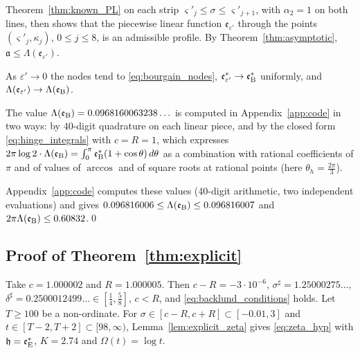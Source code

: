 \documentclass[11pt,a4paper]{article}
\makeatletter
\numberwithin{equation}{section}
\DeclareRobustCommand{\CGref}[1]{\ref{#1}}
\DeclareRobustCommand{\CGeqref}[1]{\eqref{#1}}
\let\CG@origref\ref
\let\CG@origeqref\eqref
\newcommand{\CG@gettip}[1]{\@ifundefined{CGTip@#1}{#1}{\csname CGTip@#1\endcsname}}
\DeclareRobustCommand{\CGref}[1]{\pdftooltip{\CG@origref{#1}}{\CG@gettip{#1}}}
\DeclareRobustCommand{\CGeqref}[1]{\pdftooltip{\CG@origeqref{#1}}{\CG@gettip{#1}}}
\theoremstyle{definition}
\theoremstyle{remark}
\newcommand{\eB}{\mathfrak e_{\rm B}}
\newcommand{\eE}{\mathfrak e_{\rm E}}
\makeatother
\begin{document}
Theorem~\CGref{thm:known_PL} on each strip $\varsigma'_j\le\sigma\le\varsigma'_{j+1}$, with $\alpha_2=1$ on both lines, then shows that the piecewise linear function $\mathfrak e_{\varepsilon'}$ through the points $(\varsigma'_j,\kappa_j)$, $0\le j\le8$, is an admissible profile. By Theorem~\CGref{thm:asymptotic}, $\mathfrak a\le\Lambda(\mathfrak e_{\varepsilon'})$.

As $\varepsilon'\to0$ the nodes tend to \CGeqref{eq:bourgain_nodes}, $\mathfrak e^*_{\varepsilon'}\to\eB^*$ uniformly, and $\Lambda(\mathfrak e_{\varepsilon'})\to\Lambda(\eB)$.

The value $\Lambda(\eB)=0.0968160063238\ldots$ is computed in Appendix~\CGref{app:code} in two ways: by $40$-digit quadrature on each linear piece, and by the closed form \CGeqref{eq:hinge_integrals} with $c=R=1$, which expresses $2\pi\log2\cdot\Lambda(\eB)=\int_0^\pi\eB^*(1+\cos\theta)\,d\theta$ as a combination with rational coefficients of $\pi$ and of values of $\arccos$ and of square roots at rational points (here $\theta_h=\frac{2\pi}3$).

Appendix~\CGref{app:code} computes these values (40-digit arithmetic, two independent evaluations) and gives $0.096816006\le\Lambda(\eB)\le0.096816007$ and $2\pi\Lambda(\eB)\le0.60832$.\qed

\subsection{Proof of Theorem~\ref{thm:explicit}}\label{subsec:proof_explicit}
Take $c=1.000002$ and $R=1.000005$. Then $c-R=-3\cdot10^{-6}$, $\sigma^\sharp=1.25000275\ldots$, $\delta^\sharp=0.2500012499\ldots\in[\frac14,\frac58]$, $c<R$, and \CGeqref{eq:backlund_conditions} holds. Let $T\ge100$ be a non-ordinate. For $\sigma\in[c-R,c+R]\subset[-0.01,3]$ and $t\in[T-2,T+2]\subset[98,\infty)$, Lemma~\CGref{lem:explicit_zeta} gives \CGeqref{eq:zeta_hyp} with $\mathfrak h=\eE^*$, $K=2.74$ and $\Omega(t)=\log t$.
\end{document}
